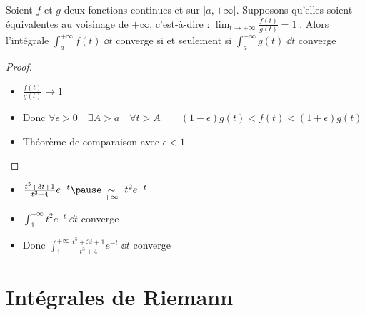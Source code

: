 \begin{frame}

\begin{theoreme}
Soient $f$ et $g$ deux fonctions continues et  sur
$[a,+\infty[$. Supposons qu'elles soient équivalentes au voisinage de $+\infty$, c'est-à-dire :
$\lim_{t\rightarrow+\infty}\frac{f(t)}{g(t)} = 1\;.$
\pause
Alors l'intégrale $\int_a^{+\infty} f(t)\;\dd t$ converge si et seulement si 
$\int_a^{+\infty} g(t)\;\dd t$ converge
\end{theoreme}
\pause
\begin{proof}
\vspace*{-2ex}
\begin{itemize}
  \item $\frac{f(t)}{g(t)} \to 1$ 
\pause  
  \item Donc $\forall \epsilon>0 \quad \exists A>a \quad \forall t>A \qquad (1-\epsilon)g(t)<f(t)<(1+\epsilon)g(t)$
\pause
  \item Théorème de comparaison avec $\epsilon<1$
  \qedhere

\end{itemize}

\end{proof}
\pause
\begin{exemple}
\begin{itemize}
  \item $\frac{t^5+3t+1}{t^3+4}e^{-t} \pause\underset{+\infty}{\sim}\ t^2e^{-t}$
  \pause
  \item $\int_1^{+\infty} t^2e^{-t}\;\dd t$ converge
  \pause
  \item Donc $\int_1^{+\infty} \frac{t^5+3t+1}{t^3+4}e^{-t}\;\dd t$ converge
\end{itemize}

\end{exemple}


\end{frame}

\section*{Intégrales de Riemann}

